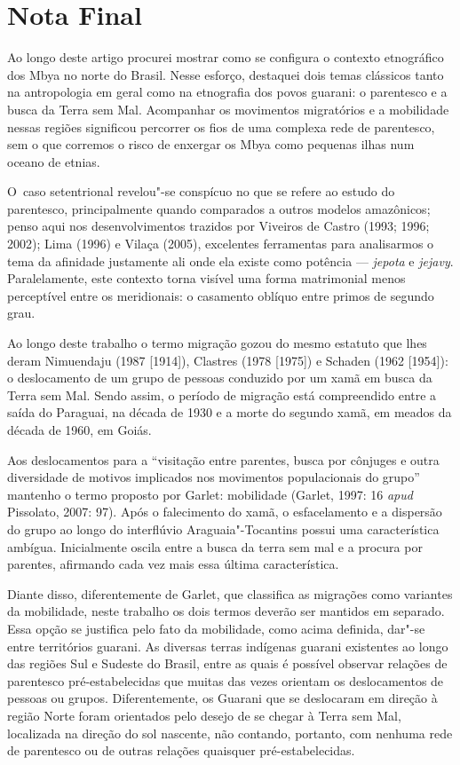 \section{Nota Final}

Ao longo deste artigo procurei mostrar como se configura o contexto
etnográfico dos Mbya no norte do Brasil. Nesse esforço, destaquei dois
temas clássicos tanto na antropologia em geral como na etnografia dos
povos guarani: o parentesco e a busca da Terra sem Mal. Acompanhar os
movimentos migratórios e a mobilidade nessas regiões significou
percorrer os fios de uma complexa rede de parentesco, sem o que
corremos o risco de enxergar os Mbya como pequenas ilhas num oceano de
etnias.

O~caso setentrional revelou"-se conspícuo no que se refere ao estudo do
parentesco, principalmente quando comparados a outros modelos
amazônicos; penso aqui nos desenvolvimentos trazidos por Viveiros de
Castro (1993; 1996; 2002); Lima (1996) e Vilaça (2005), excelentes
ferramentas para analisarmos o tema da afinidade justamente ali onde
ela existe como potência --- \emph{jepota} e \emph{jejavy}. Paralelamente, este
contexto torna visível uma forma matrimonial menos perceptível entre os
meridionais: o casamento oblíquo entre primos de segundo grau.

Ao longo deste trabalho o termo migração gozou do mesmo estatuto que
lhes deram Nimuendaju (1987 [1914]), Clastres (1978 [1975]) e Schaden
(1962 [1954]): o deslocamento de um grupo de pessoas conduzido por um
xamã em busca da Terra sem Mal. Sendo assim, o período de migração está
compreendido entre a saída do Paraguai, na década de 1930 e a morte do
segundo xamã, em meados da década de 1960, em Goiás.

Aos deslocamentos para a ``visitação entre parentes, busca por cônjuges e
outra diversidade de motivos implicados nos movimentos populacionais do
grupo'' mantenho o termo proposto por Garlet: mobilidade (Garlet, 1997:
16 \emph{apud} Pissolato, 2007: 97). Após o falecimento do xamã, o
esfacelamento e a dispersão do grupo ao longo do interflúvio
Araguaia"-Tocantins possui uma característica ambígua. Inicialmente
oscila entre a busca da terra sem mal e a procura por parentes,
afirmando cada vez mais essa última característica. 

Diante disso, diferentemente de Garlet, que classifica as migrações como
variantes da mobilidade, neste trabalho os dois termos deverão ser
mantidos em separado. Essa opção se justifica pelo fato da mobilidade,
como acima definida, dar"-se entre territórios guarani. As diversas
terras indígenas guarani existentes ao longo das regiões Sul e Sudeste
do Brasil, entre as quais é possível observar relações de parentesco
pré-estabelecidas que muitas das vezes orientam os deslocamentos de
pessoas ou grupos. Diferentemente, os Guarani que se deslocaram em
direção à região Norte foram orientados pelo desejo de se chegar à
Terra sem Mal, localizada na direção do sol nascente, não contando,
portanto, com nenhuma rede de parentesco ou de outras relações
quaisquer pré-estabelecidas.

